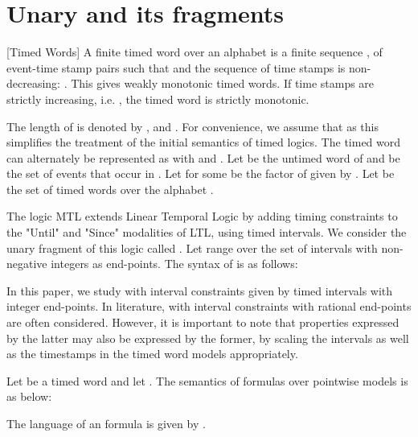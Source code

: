 \documentclass{llncs}
\newcommand{\mtlfp}{\mbox{}}
\newcommand{\mitl}{\mbox{}}
\newcommand{\mtl}{\mbox{}}
\begin{document}
\section{Unary \mitl\/ and its fragments}
\label{sec:mitlsem}
\begin{definition}{[Timed Words]}
A finite timed word over an alphabet  is a finite sequence , of event-time stamp pairs 
such that  and the 
sequence of time stamps is non-decreasing: . This gives weakly monotonic timed words. If
time stamps are strictly increasing, i.e. , the timed word is strictly monotonic.
\end{definition}
The length of  is denoted by , and . For convenience, we assume  that  as
this simplifies the treatment of the initial semantics of timed logics. The timed word  can alternately be represented as 
 with  and 
. Let
 be the untimed word of  and  be the set of events that occur in . Let  for some  be the factor of  given by .
Let  be the set of timed words over the alphabet .


The logic MTL \cite{Koy90,AH91} extends Linear Temporal Logic by adding timing
constraints to the "Until" and "Since" modalities of LTL, using timed intervals. We consider the unary fragment of this logic called \mtlfp. Let  range over the set of intervals with non-negative integers as end-points. The syntax of \mtlfp\/ is as follows:


\begin{remark}
In this paper, we study \mtl\/ with interval constraints given by timed intervals with integer end-points. In literature, \mtl\/ with interval constraints with rational end-points are often considered. However, it is important to note that properties expressed by the latter may also be expressed by the former, by scaling the intervals as well as the timestamps in the timed word models appropriately.
\end{remark}

Let  be a timed word and let
. The semantics of \mtlfp\/ formulas over pointwise models is as below:

The language of an \mtlfp\/ formula  is given by .\\
\end{document}
